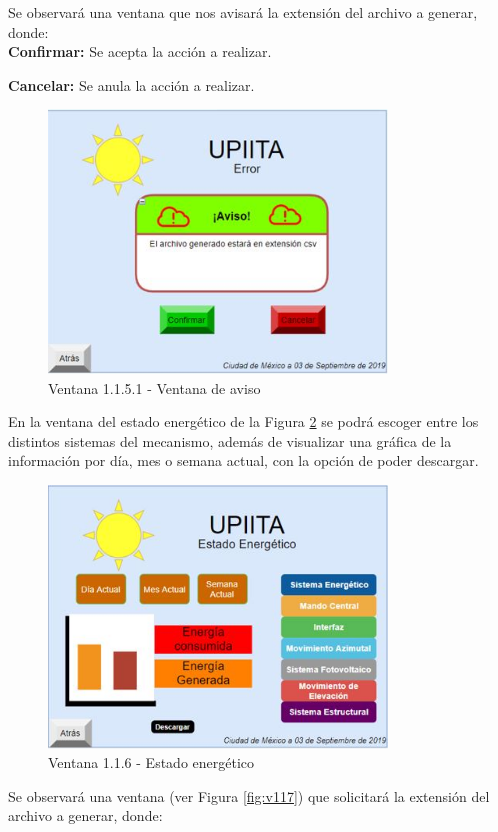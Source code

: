 Se observará una ventana que nos avisará la extensión del archivo a generar, donde: \\

\textbf{Confirmar:} Se acepta la acción a realizar.

\textbf{Cancelar:} Se anula la acción a realizar.
\begin{figure}[H]
	\centering
	\includegraphics[width=9cm]{imagenes/v1151}
	\caption{Ventana 1.1.5.1 - Ventana de aviso}
	\label{fig:v1151}
\end{figure}

En la ventana del estado energético de la Figura \ref{fig:v116} se podrá escoger entre los distintos sistemas del mecanismo, además de visualizar una gráfica de la información por día, mes o semana actual, con la opción de poder descargar.\\
\begin{figure}[H]
	\centering
	\includegraphics[width=9cm]{imagenes/v116}
	\caption{Ventana 1.1.6 - Estado energético}
	\label{fig:v116}
\end{figure}

Se observará una ventana (ver Figura \ref{fig:v117}) que solicitará la extensión del archivo a generar, donde: \\


